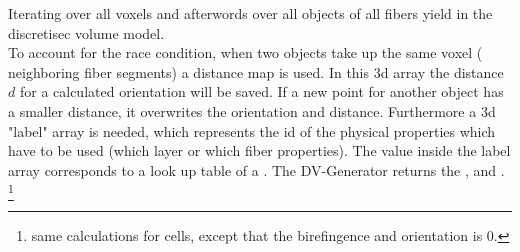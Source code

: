% 
Iterating over all voxels and afterwords over all objects of all fibers yield in the discretisec volume model.\\
% 
To account for the race condition, when two objects take up the same voxel (\eg{} neighboring fiber segments) a distance map  is used.
In this 3d array the distance $d$ for a calculated orientation will be saved.
If a new point for another object has a smaller distance, it overwrites the orientation and distance.
Furthermore a 3d "label" array is needed, which represents the id of the physical properties which have to be used (\eg which layer or which fiber properties).
The value inside the label array corresponds to a look up table of a .
% 
The DV-Generator returns the ,  and .
% 
\footnote{same calculations for cells, except that the birefingence and orientation is $0$.}
% 
